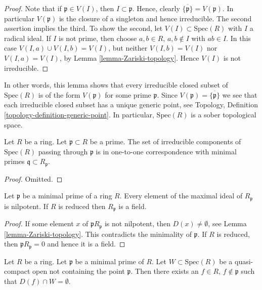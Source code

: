 \begin{proof}
Note that if $ \mathfrak p \in V(I)$, then
$I \subset \mathfrak p$. Hence,
clearly $\overline{\{\mathfrak p\}} = V(\mathfrak p)$.
In particular $V(\mathfrak p)$ is the closure of
a singleton and hence irreducible.
The second assertion implies the third.
To show the second, let
$V(I) \subset \text{Spec}(R)$ with $I$ a radical ideal.
If $I$ is not prime, then choose $a,b\in R$, $a,b\not \in I$
with $ab\in I$. In this case $V(I,a) \cup V(I,b) = V(I)$,
but neither $V(I,b) = V(I)$ nor $V(I,a) = V(I)$, by
Lemma \ref{lemma-Zariski-topology}. Hence $V(I)$ is not
irreducible.
\end{proof}

\noindent
In other words, this lemma shows that every irreducible closed
subset of $\text{Spec}(R)$ is of the form $V(\mathfrak p)$ for
some prime $\mathfrak p$. Since $V(\mathfrak p) = \overline{\{\mathfrak p\}}$
we see that each irreducible closed subset has a unique generic point,
see Topology, Definition \ref{topology-definition-generic-point}.
In particular, $\text{Spec}(R)$ is a sober topological space.

\begin{lemma}
\label{lemma-irreducible-components-containing-x}
Let $R$ be a ring.
Let $\mathfrak p \subset R$ be a prime.
The set of irreducible components of $\text{Spec}(R)$ passing through
$\mathfrak p$ is in one-to-one correspondence with minimal
primes $\mathfrak q \subset R_{\mathfrak p}$.
\end{lemma}

\begin{proof}
Omitted.
\end{proof}


\begin{lemma}
\label{lemma-minimal-prime-reduced-ring}
Let $\mathfrak p$ be a minimal prime of a ring $R$.
Every element of the maximal ideal of $R_{\mathfrak p}$
is nilpotent. If $R$ is reduced then $R_{\mathfrak p}$
is a field.
\end{lemma}

\begin{proof}
If some element $x$ of ${\mathfrak p}R_{\mathfrak p}$
is not nilpotent, then $D(x) \not = \emptyset$, see
Lemma \ref{lemma-Zariski-topology}. This contradicts
the minimality of $\mathfrak p$. If $R$ is reduced,
then ${\mathfrak p}R_{\mathfrak p} = 0$ and
hence it is a field.
\end{proof}

\begin{lemma}
\label{lemma-standard-open-containing-maximal-point}
Let $R$ be a ring.
Let $\mathfrak p$ be a minimal prime of $R$.
Let $W \subset \text{Spec}(R)$ be a quasi-compact open
not containing the point $\mathfrak p$. Then there
exists an $f \in R$, $f \not \in \mathfrak p$ such
that $D(f) \cap W = \emptyset$.
\end{lemma}


